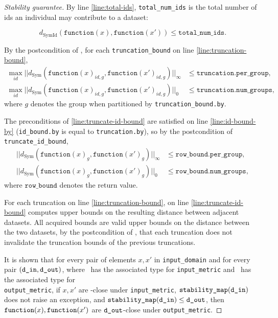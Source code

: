 \documentclass{article}
\begin{document}
\begin{proof}[Stability guarantee]
    By line \ref{line:total-ids}, \texttt{total\_num\_ids} is the total number of ids an individual may contribute to a dataset:

    \begin{equation}
        d_{\mathrm{SymId}}(\texttt{function}(x), \texttt{function}(x')) \le \texttt{total\_num\_ids}.
    \end{equation}

    By the postcondition of ,
    for each \texttt{truncation\_bound} on line \ref{line:truncation-bound},
    \begin{align*}
        \max_{id} ||d_{\mathrm{Sym}}(\texttt{function}(x)_{id,g}, \texttt{function}(x')_{id,g})||_\infty &\le \texttt{truncation.per\_group}, \\
        \max_{id} ||d_{\mathrm{Sym}}(\texttt{function}(x)_{id,g}, \texttt{function}(x')_{id,g})||_0 &\le \texttt{truncation.num\_groups},
    \end{align*}
    where $g$ denotes the group when partitioned by \texttt{truncation\_bound.by}.
    
    The preconditions of \ref{line:truncate-id-bound} are satisfied on line \ref{line:id-bound-by}
    (\texttt{id\_bound.by} is equal to \texttt{truncation.by}),
    so by the postcondition of \texttt{truncate\_id\_bound},
    \begin{align*}
        ||d_{\mathrm{Sym}}(\texttt{function}(x)_{g}, \texttt{function}(x')_{g})||_\infty &\le \texttt{row\_bound.per\_group}, \\
        ||d_{\mathrm{Sym}}(\texttt{function}(x)_{g}, \texttt{function}(x')_{g})||_0 &\le \texttt{row\_bound.num\_groups},
    \end{align*}
    where $\texttt{row\_bound}$ denotes the return value.

    For each truncation on line \ref{line:truncation-bound},
     on line \ref{line:truncate-id-bound}
    computes upper bounds on the resulting distance between adjacent datasets.
    All acquired bounds are valid upper bounds on the distance between the two datasets,
    by the postcondition of ,
    that each truncation does not invalidate the truncation bounds of the previous truncations.

    It is shown that for every pair of elements $x, x'$ in \texttt{input\_domain} and for every pair $(\texttt{d\_in}, \texttt{d\_out})$,
    where \din\ has the associated type for \texttt{input\_metric} and \dout\ has the associated type for \\ \texttt{output\_metric},
    if $x, x'$ are \din-close under \texttt{input\_metric}, $\texttt{stability\_map}(\texttt{d\_in})$ does not raise an exception,
    and $\texttt{stability\_map}(\texttt{d\_in}) \leq \texttt{d\_out}$,
    then $\texttt{function}(x), \texttt{function}(x')$ are $\texttt{d\_out}$-close under \texttt{output\_metric}.
\end{proof}
\end{document}
